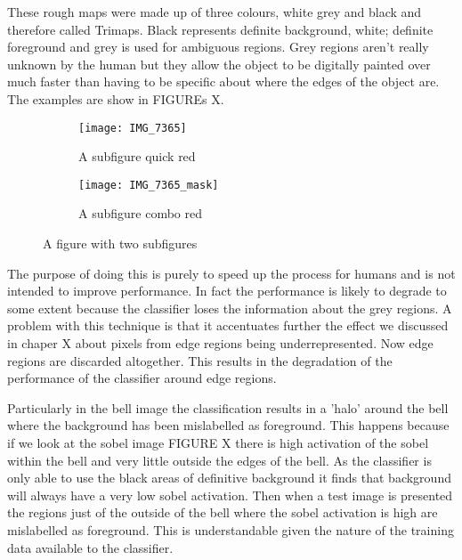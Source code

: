 \documentclass[12pt]{IIBproject}
\begin{document}
These rough maps were made up of three colours, white grey and black and therefore called Trimaps. Black represents definite background, white; definite foreground and grey is used for ambiguous regions. Grey regions aren't really unknown by the human but they allow the object to be digitally painted over much faster than having to be specific about where the edges of the object are. The examples are show in FIGUREs X. 
\begin{figure}[H]
\centering
\begin{subfigure}{.45\textwidth}
  \centering
  \texttt{[image: IMG\_7365]}
  \caption{A subfigure quick red}
  \label{fig:sub2}
\end{subfigure}

\begin{subfigure}{.45\textwidth}
  \centering
  \texttt{[image: IMG\_7365\_mask]}
  \caption{A subfigure combo red}
  \label{fig:sub2}
\end{subfigure}

\caption{A figure with two subfigures}
\label{fig:test}
\end{figure}

The purpose of doing this is purely to speed up the process for humans and is not intended to improve performance. In fact the performance is likely to degrade to some extent because the classifier loses the information about the grey regions. 
A problem with this technique is that it accentuates further the effect we discussed in chaper X about pixels from edge regions being underrepresented. Now edge regions are discarded altogether. This results in the degradation of the performance of the classifier around edge regions. 

Particularly in the bell image the classification results in a 'halo' around the bell where the background has been mislabelled as foreground. This happens because if we look at the sobel image FIGURE X there is high activation of the sobel within the bell and very little outside the edges of the bell. As the classifier is only able to use the black areas of definitive background it finds that background will always have a very low sobel activation. Then when a test image is presented the regions just of the outside of the bell where the sobel activation is high are mislabelled as foreground. This is understandable given the nature of the training data available to the classifier.
\end{document}

